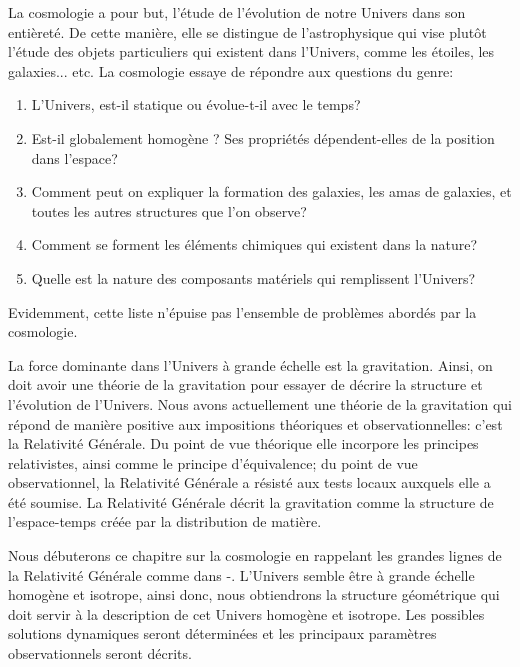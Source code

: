 \documentclass[a4paper,12pt]{report}
\theoremstyle{plain}
\theoremstyle{plain}
\begin{document}
La cosmologie a pour but,  l'\'etude de l'\'evolution de notre Univers dans son enti\`eret\'e.  De cette mani\`ere,  elle
se distingue de l'astrophysique qui vise plut\^ot l'\'etude des objets particuliers qui
existent dans l'Univers,  comme les \'etoiles,  les galaxies...  etc.   La cosmologie essaye de
r\'epondre aux questions du genre: 
\begin{enumerate}
\item L'Univers,  est-il statique ou \'evolue-t-il avec le temps? \item
Est-il globalement homog\`ene ? 
Ses propri\'et\'es d\'ependent-elles de la
position dans l'espace? \item Comment peut on expliquer la
formation des galaxies,  les amas de galaxies,  et toutes les autres
structures que l'on observe? \item Comment se forment les
\'el\'ements chimiques qui existent dans la nature? \item Quelle est
la nature des composants mat\'eriels qui remplissent l'Univers?
\end{enumerate}
Evidemment,  cette liste n'\'epuise pas l'ensemble de probl\`emes
abord\'es par la cosmologie. 
\par
La force dominante dans l'Univers \`a grande \'echelle est la
gravitation.  Ainsi,  on doit avoir une th\'eorie de la gravitation
pour essayer de d\'ecrire la structure et l'\'evolution de
l'Univers.  Nous avons actuellement une th\'eorie de la gravitation
qui r\'epond de mani\`ere positive aux impositions th\'eoriques et
observationnelles:  c'est la Relativit\'e G\'en\'erale.  Du point de
vue th\'eorique elle incorpore les principes relativistes,  ainsi
comme le principe d'\'equivalence; du point de vue
observationnel,  la Relativit\'e G\'en\'erale a r\'esist\'e aux
tests locaux auxquels elle a \'et\'e soumise.  La Relativit\'e
G\'en\'erale d\'ecrit la gravitation comme la structure de
l'espace-temps cr\'e\'ee par la distribution de mati\`ere. 
\par
Nous d\'ebuterons ce chapitre sur la cosmologie en rappelant les
grandes lignes de la Relativit\'e G\'en\'erale comme dans \cite{julio}-\cite{gasperini}. 
L'Univers semble \^etre \`a grande \'echelle homog\`ene et
isotrope,  ainsi donc,   nous obtiendrons la structure
g\'eom\'etrique qui doit servir \`a la description de cet Univers
homog\`ene et isotrope.  Les possibles solutions dynamiques seront
d\'etermin\'ees et les principaux param\`etres observationnels seront
d\'ecrits.
\end{document}
